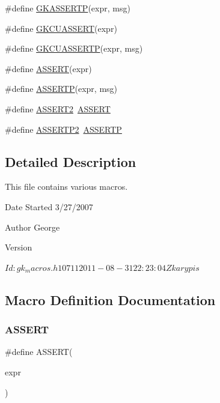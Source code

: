 \begin{DoxyCompactItemize}
\#define \hyperlink{a00053_a248806723b770fadba36a99fbea64af1}{G\+K\+A\+S\+S\+E\+R\+TP}(expr,  msg)
\item 
\#define \hyperlink{a00053_a5587b7fac80cfb26c76899eb2aa32c97}{G\+K\+C\+U\+A\+S\+S\+E\+RT}(expr)
\item 
\#define \hyperlink{a00053_ad513556baf4c676ebcf2e7f1890f4902}{G\+K\+C\+U\+A\+S\+S\+E\+R\+TP}(expr,  msg)
\item 
\#define \hyperlink{a00053_a28301f76c53b643912da7c538f74e2c6}{A\+S\+S\+E\+RT}(expr)
\item 
\#define \hyperlink{a00053_a4debd5b68733bb78770eb49bfd059744}{A\+S\+S\+E\+R\+TP}(expr,  msg)
\item 
\#define \hyperlink{a00053_a7e1dd78e319657b8d5d4d70e9dda108d}{A\+S\+S\+E\+R\+T2}~\hyperlink{a00053_a28301f76c53b643912da7c538f74e2c6}{A\+S\+S\+E\+RT}
\item 
\#define \hyperlink{a00053_af17c469dea88cdca6f53f9ae726670f2}{A\+S\+S\+E\+R\+T\+P2}~\hyperlink{a00053_a4debd5b68733bb78770eb49bfd059744}{A\+S\+S\+E\+R\+TP}
\end{DoxyCompactItemize}


\subsection{Detailed Description}
This file contains various macros. 

\begin{DoxyDate}{Date}
Started 3/27/2007 
\end{DoxyDate}
\begin{DoxyAuthor}{Author}
George 
\end{DoxyAuthor}
\begin{DoxyVersion}{Version}
\begin{DoxyVerb}$Id: gk_macros.h 10711 2011-08-31 22:23:04Z karypis $ \end{DoxyVerb}
 
\end{DoxyVersion}


\subsection{Macro Definition Documentation}
\mbox{\label{a00053_a28301f76c53b643912da7c538f74e2c6}} 
\subsubsection{\texorpdfstring{A\+S\+S\+E\+RT}{ASSERT}}
{\footnotesize\ttfamily \#define A\+S\+S\+E\+RT(\begin{DoxyParamCaption}\item[{}]{expr }\end{DoxyParamCaption})}

